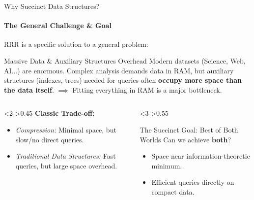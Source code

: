 \begin{frame}{Why Succinct Data Structures?}
    \framesubtitle{The General Challenge \& Goal}

    RRR is a specific solution to a general problem:
    \begin{block}{Massive Data \& Auxiliary Structures Overhead}
        Modern datasets (Science, Web, AI...) are enormous. Complex analysis demands data in RAM, but auxiliary structures (indexes, trees) needed for queries often \textbf{occupy more space than the data itself}.
        $\implies$ Fitting everything in RAM is a major bottleneck.
    \end{block}
    \pause
    \begin{columns}[T]
        \begin{column}<2->{0.45\textwidth}
            \textbf{Classic Trade-off:}
            \begin{itemize}
                \item \textit{Compression:} Minimal space, but slow/no direct queries.
                \item \textit{Traditional Data Structures:} Fast queries, but large space overhead.
            \end{itemize}
        \end{column}
        \begin{column}<3->{0.55\textwidth}
            \begin{alertblock}{The Succinct Goal: Best of Both Worlds}
                Can we achieve \textbf{both}?
                \begin{itemize}
                    \item Space \alert{near information-theoretic minimum}.
                    \item Efficient queries \alert{directly} on compact data.
                \end{itemize}
            \end{alertblock}
        \end{column}
    \end{columns}
\end{frame}

